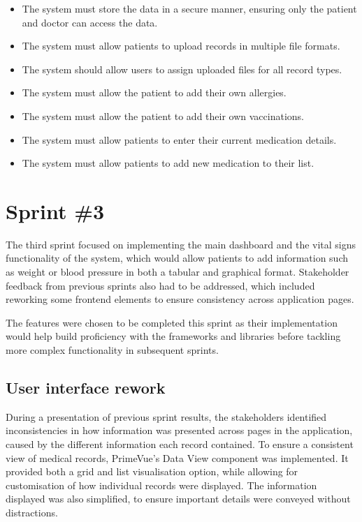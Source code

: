 \begin{itemize}
    \item The system must store the data in a secure manner, ensuring only the patient and doctor can access the data.
    \item The system must allow patients to upload records in multiple file formats.
    \item The system should allow users to assign uploaded files for all record types.
    \item The system must allow the patient to add their own allergies.
    \item The system must allow the patient to add their own vaccinations.
    \item The system must allow patients to enter their current medication details.
    \item The system must allow patients to add new medication to their list.
\end{itemize}

\section{Sprint \#3}

The third sprint focused on implementing the main dashboard and the vital signs functionality of the system, which would allow patients to add information such as weight or blood pressure in both a tabular and graphical format. Stakeholder feedback from previous sprints also had to be addressed, which included reworking some frontend elements to ensure consistency across application pages.

The features were chosen to be completed this sprint as their implementation would help build proficiency with the frameworks and libraries before tackling more complex functionality in subsequent sprints.

\subsection{User interface rework}

During a presentation of previous sprint results, the stakeholders identified inconsistencies in how information was presented across pages in the application, caused by the different information each record contained. To ensure a consistent view of medical records, PrimeVue's Data View component was implemented. It provided both a grid and list visualisation option, while allowing for customisation of how individual records were displayed. The information displayed was also simplified, to ensure important details were conveyed without distractions. 

